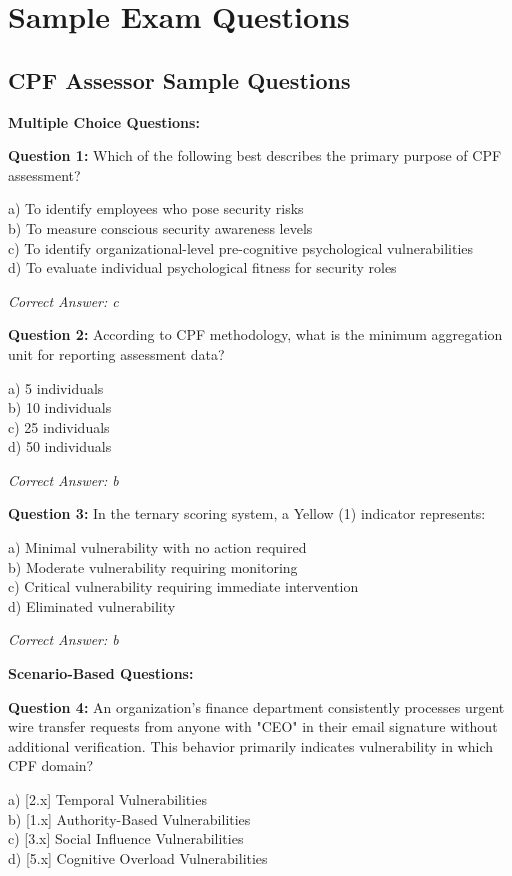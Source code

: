 \documentclass[11pt,a4paper]{article}
\begin{document}
\section{Sample Exam Questions}

\subsection{CPF Assessor Sample Questions}

\textbf{Multiple Choice Questions:}

\textbf{Question 1:} Which of the following best describes the primary purpose of CPF assessment?

a) To identify employees who pose security risks\\
b) To measure conscious security awareness levels\\
c) To identify organizational-level pre-cognitive psychological vulnerabilities\\
d) To evaluate individual psychological fitness for security roles

\textit{Correct Answer: c}

\textbf{Question 2:} According to CPF methodology, what is the minimum aggregation unit for reporting assessment data?

a) 5 individuals\\
b) 10 individuals\\
c) 25 individuals\\
d) 50 individuals

\textit{Correct Answer: b}

\textbf{Question 3:} In the ternary scoring system, a Yellow (1) indicator represents:

a) Minimal vulnerability with no action required\\
b) Moderate vulnerability requiring monitoring\\
c) Critical vulnerability requiring immediate intervention\\
d) Eliminated vulnerability

\textit{Correct Answer: b}

\textbf{Scenario-Based Questions:}

\textbf{Question 4:} An organization's finance department consistently processes urgent wire transfer requests from anyone with "CEO" in their email signature without additional verification. This behavior primarily indicates vulnerability in which CPF domain?

a) [2.x] Temporal Vulnerabilities\\
b) [1.x] Authority-Based Vulnerabilities\\
c) [3.x] Social Influence Vulnerabilities\\
d) [5.x] Cognitive Overload Vulnerabilities
\end{document}
